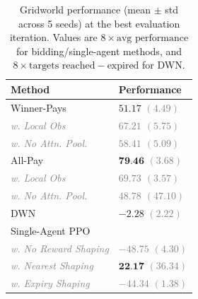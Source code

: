 \begin{table}
  \centering
  \caption{Gridworld performance (mean $\pm$ std across 5 seeds) at the best evaluation iteration. Values are $8 \times \text{avg performance}$ for bidding/single-agent methods, and $8 \times \text{targets reached} - \text{expired}$ for DWN.}
  \begin{tabular}{ll}
    \toprule
    {\bf Method} & {\bf Performance} \\
    \midrule
    Winner-Pays & $51.17$ {\small\textcolor{gray}{$(4.49)$}} \\
    \textcolor{gray}{\itshape\hspace{1em}w. Local Obs} & \textcolor{gray}{\itshape $67.21$ {\small$(5.75)$}} \\
    \textcolor{gray}{\itshape\hspace{1em}w. No Attn. Pool.} & \textcolor{gray}{\itshape $58.41$ {\small$(5.09)$}} \\
    All-Pay & $\textbf{79.46}$ {\small\textcolor{gray}{$(3.68)$}} \\
    \textcolor{gray}{\itshape\hspace{1em}w. Local Obs} & \textcolor{gray}{\itshape $69.73$ {\small$(3.57)$}} \\
    \textcolor{gray}{\itshape\hspace{1em}w. No Attn. Pool.} & \textcolor{gray}{\itshape $48.78$ {\small$(47.10)$}} \\
    \midrule
    DWN & $-2.28$ {\small\textcolor{gray}{$(2.22)$}} \\
    Single-Agent PPO & \\
    \textcolor{gray}{\itshape\hspace{1em}w. No Reward Shaping} & \textcolor{gray}{\itshape $-48.75$ {\small$(4.30)$}} \\
    \textcolor{gray}{\itshape\hspace{1em}w. Nearest Shaping} & $\textbf{22.17}$ {\small\textcolor{gray}{$(36.34)$}} \\
    \textcolor{gray}{\itshape\hspace{1em}w. Expiry Shaping} & \textcolor{gray}{\itshape $-44.34$ {\small$(1.38)$}} \\
    \bottomrule
  \end{tabular}
  \label{tab:gridworld_methods}
\end{table}

